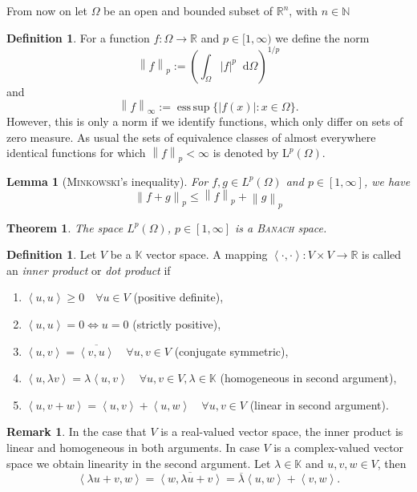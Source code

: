 \documentclass[12pt,a4paper,twoside, open=right]{scrreprt}
\theoremstyle{definition}
\newtheorem{rem}[auf]{Remark}
\newtheorem{defn}[auf]{Definition}
\theoremstyle{plain}
\newtheorem{sa}[auf]{Theorem}
\newtheorem{lem}[auf]{Lemma}
\DeclareMathOperator*{\esssup}{ess\,sup} %
\newcommand{\abs}[1]{\left\vert #1\right\vert}
\newcommand{\dotp}[2]{\left\langle #1,#2\right\rangle}
\newcommand{\rr}{\mathbb{R}}
\newcommand{\kk}{\mathbb{K}}
\newcommand{\nn}{\mathbb{N}}
\newcommand{\norm}[1]{\left\lVert#1\right\rVert}
\newcommand{\D}{\mathop{}\!\mathrm{d}}
\begin{document}
From now on let $\Omega$ be an open and bounded subset of $\rr^n$, with $n\in\nn$
\begin{defn}
    For a function $f\colon\Omega\to\rr$ and $p\in[1,\infty)$ we define the norm
     \begin{equation}
    \norm{f}_{p}:=\left(\int_\Omega\abs{f}^p\D\Omega\right)^{1/p}
    \end{equation}
    and
     \begin{equation}
    \norm{f}_{\infty}:=\esssup\{\abs{f(x)}\colon x\in\Omega\}.
    \end{equation}
    However, this is only a norm if we identify functions, which only differ on sets of zero measure. As usual the sets of equivalence classes of almost everywhere identical functions for which $\norm{f}_p<\infty$ is denoted by $\mathrm{L}^p(\Omega)$.
\end{defn}
\begin{lem}[\textsc{Minkowski}'s inequality]
    For $f,g\in L^p(\Omega)$ and $p\in[1,\infty]$, we have
    \begin{equation}
        \norm{f+g}_p\le\norm{f}_p+\norm{g}_p
    \end{equation}
\end{lem}
\begin{sa}
    The space $L^p(\Omega)$, $p\in[1,\infty]$ is a \textsc{Banach} space.
\end{sa}
\begin{defn}
    Let $V$ be a $\kk$ vector space. A mapping $\dotp{\cdot}{\cdot}\colon V\times V\to\rr$ is called an \emph{inner product} or \emph{dot product} if 
    \begin{enumerate}
        \item $\dotp{u}{u} \ge 0 \quad \forall u\in V$ (positive definite),
        \item $\dotp{u}{u} = 0 \Leftrightarrow u=0 $  (strictly positive),
        \item $\dotp{u}{v} = \overline{\dotp{v}{u}}   \quad\forall u,v\in V$ (conjugate symmetric),
        \item $\dotp{u}{\lambda v} = \lambda\dotp{u}{v} \quad\forall u,v\in V,\lambda\in\kk$ (homogeneous in second argument),
        \item $\dotp{u}{v+w} =\dotp{u}{v}+\dotp{u}{w} \quad\forall u,v\in V$ (linear in second argument).
    \end{enumerate}
\end{defn}
\begin{rem}
    In the case that $V$ is a real-valued vector space, the inner product is linear and homogeneous in both arguments. In case $V$ is a complex-valued vector space we obtain linearity in the second argument. Let $\lambda\in\kk$ and $u,v,w\in V$, then
    \begin{equation}
        \dotp{\lambda u +v}{w}=\overline{\dotp{w}{\lambda u + v}}=\overline{\lambda}\dotp{u}{w}+\dotp{v}{w}.
    \end{equation}
\end{rem}
\end{document}
